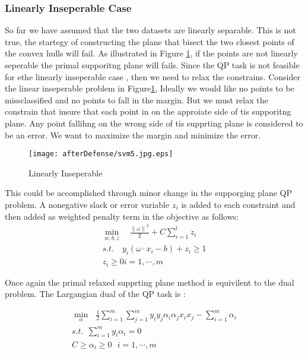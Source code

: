 \subsubsection{Linearly Inseperable Case}
 So far we have assumed that the two datasets are linearly separable. This is not true, the startegy of constructing the plane that bisect the two closest points of the convex hulls will fail. As illustrated in Figure \ref{fig:svm5}, if the points are not linearly seperable the primal supporitng plane will fails. Since the QP task is not feasible for ethe linearly inseperable case , then we need to relax the constrains. Consider the linear inseperable problem in Figure\ref{fig:svm5}, Ideally we would like no points to be missclassified and no points to fall in the margin. But we must relax the constrain that insure that each point in on the approiate side of tis supporitng plane. Any point fallihng on the wrong side of tis supprting plane is considered to be an error. We want to maximize the margin and minimize the error. 
 
\begin{figure}
	\centering
		\texttt{[image: afterDefense/svm5.jpg.eps]}
	\caption{Linearly Inseperable}
	\label{fig:svm5}
\end{figure}

 This could be accomplished through minor change in the supporging plane QP problem. A nonegative slack or error variable $z_i$ is added to each constraint and then added as weighted penalty term in the objective as follows:
 \begin{equation}
 \begin{array}{c}
\min_{w,b,z}  \quad \frac{{\parallel \omega \parallel}^2}{2}+C \sum_{i=1}^{l}z_i  \\
s.t.  \quad y_i(\omega \cdot x_i -b)+z_i \geq 1  \\
    z_i \geq 0  i=1,\cdots,m
\end{array} 
\label{eq:inseperable}
\end{equation} 

Once again the primal relaxed supprting plane method is equivilent to the dual problem. The Largangian dual of the QP task is :

\begin{equation}
\begin{array}{c}
\min_{\alpha} \ \ \   \frac{1}{2} \sum_{i=1}^{m}{\sum_{j=1}^{m}{y_iy_j\alpha_i\alpha_jx_ix_j}} - \sum_{i=1}^{m}{\alpha_i} \\
s.t. \ \ \sum_{i=1}^{m}{y_i\alpha_i}=0   \\
 C \geq \alpha_i \geq 0  \ \ \ i=1,\cdots , m 
 \end{array} 
\label{eq:dual}
\end{equation}



